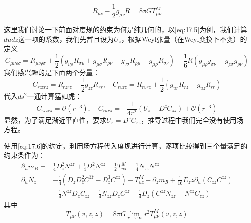 \begin{equation}
	R_{\mu\nu}-\frac{1}{2}g_{\mu\nu}R=8\pi G T^M_{\mu\nu}
\end{equation}
\begin{remark}
	这里我们讨论一下前面对度规的约束为何是纯几何的，以\ref{eq:17.5}为例，我们计算$dudz$这一项的系数，我们先暂且设为$U_z$，根据Weyl张量（在Weyl变换下不变）的定义：
	\begin{equation}
		C_{\mu\nu\rho\sigma}=R_{\mu\nu\rho\sigma}+\frac{1}{2}\left(g_{\nu\rho}R_{\sigma\mu}+g_{\mu\sigma}R_{\rho\nu}-g_{\nu\sigma}R_{\rho\mu}-g_{\mu\rho}R_{\sigma\nu}\right)+\frac{1}{6}R\left(g_{\mu\rho}g_{\sigma\nu}-g_{\mu\sigma}g_{\rho\nu}\right)
	\end{equation}
	我们感兴趣的是下面两个分量：
	\begin{equation}
		C_{rzzrz}=R_{rzrz}-\frac{1}{2}g_{zz}R_{rr},\quad C_{rurz}=R_{rurz}+\frac{1}{2}(g_{ur}R_{rz}-g_{uz}R_{rr})
	\end{equation}
	代入$ds^2$一通计算猛如虎：
	\begin{equation}
		C_{rzzrz}=\mathcal{O}(r^{-3}),\quad C_{rurz}=-\frac{1}{4r^2}\left(U_z-D^z C_{zz}\right)+\mathcal{O}(r^{-3})
	\end{equation}
	显然，为了满足渐近平直性，要求$U_z=D^zC_{zz}$，推导过程中我们完全没有使用场方程。
\end{remark}
使用\ref{eq:17.6}的约定，利用场方程代入度规进行计算，逐项比较得到三个量满足的约束条件为：
\begin{equation}
	\begin{aligned}
		\partial_u m_B=&\frac{1}{4}D_z^2N^{zz}+\frac{1}{4}D_{\bar z}^2N^{\bar z\bar z}-\frac{1}{2}T^M_{uu}-\frac{1}{4}N_{zz}N^{zz}\\
		\partial_u N_z=&-\frac{1}{4}\left(D_zD_{\bar z}^2C^{\bar z\bar z}-D^3_zC^{zz}\right)-T^{M}_{uz}+\partial_z m_B+\frac{1}{16}D_zz\partial_u(C_{zz}C^{zz})\\
		&-\frac{1}{4}N^{zz}D_zC_{zz}-\frac{1}{4}N_{zz}D_zC^{zz}-\frac{1}{4}D_z\left(C^{zz}N_{zz}-N^{zz}C_{zz}\right)
	\end{aligned}
\end{equation}
其中
\begin{equation}
	T_{\mu\nu}(u,z,\bar z)=8\pi G\lim_{r\to\infty}r^2 T^M_{\mu\nu}(u,z,\bar z)
\end{equation}

